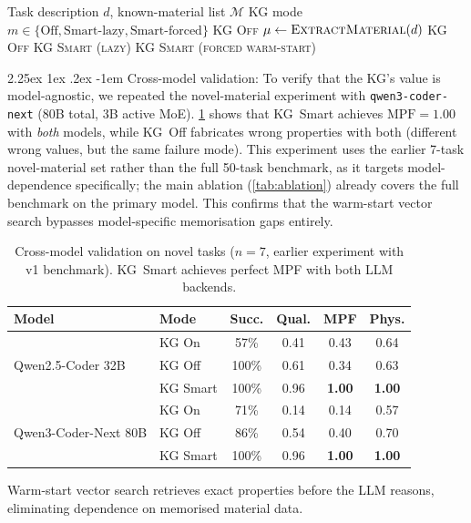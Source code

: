 \documentclass[preprint,review,12pt]{elsarticle}
\makeatletter
\renewcommand\paragraph{\@startsection{paragraph}{4}{\z@}%
  {2.25ex \@plus1ex \@minus.2ex}%
  {-1em}%
  {\normalfont\normalsize\bfseries}}
\makeatother
\begin{document}
\begin{algorithm}[t]
\caption{Adaptive KG Mode Selection}
\label{alg:kg-decision}
\begin{algorithmic}[1]
\Require Task description $d$, known-material list $\mathcal{M}$
\Ensure KG mode $m \in \{\text{Off}, \text{Smart-lazy}, \text{Smart-forced}\}$
  \State \Return \textsc{KG Off}
\EndIf
\State $\mu \gets \textsc{ExtractMaterial}(d)$
\If{$\mu = \varnothing$}
  \State \Return \textsc{KG Off}
  \State \Return \textsc{KG Smart (lazy)}
\Else
  \State \Return \textsc{KG Smart (forced warm-start)}
\EndIf
\end{algorithmic}
\end{algorithm}

\paragraph{Cross-model validation:}
To verify that the KG's value is model-agnostic, we repeated the
novel-material experiment with \texttt{qwen3-coder-next} (80B total,
3B active MoE).  \cref{tab:multi-model} shows that KG~Smart achieves
$\text{MPF}{=}1.00$ with \emph{both} models, while KG~Off fabricates
wrong properties with both (different wrong values, but the same
failure mode).  This experiment uses the earlier 7-task novel-material
set rather than the full 50-task benchmark, as it targets
model-dependence specifically; the main ablation (\cref{tab:ablation})
already covers the full benchmark on the primary model.
This confirms that the warm-start vector search
bypasses model-specific memorisation gaps entirely.

\begin{table}[t]
\centering
\caption{Cross-model validation on novel tasks ($n{=}7$, earlier
  experiment with v1 benchmark).  KG~Smart achieves perfect MPF with
  both LLM backends.}
\label{tab:multi-model}
\footnotesize
\setlength{\tabcolsep}{3pt}
\begin{tabular}{@{}llcccc@{}}
\toprule
Model & Mode & Succ. & Qual. & MPF & Phys. \\
\midrule
\multirow{3}{*}{Qwen2.5-Coder 32B}
  & KG On    & 57\% & 0.41 & 0.43 & 0.64 \\
  & KG Off   & 100\% & 0.61 & 0.34 & 0.63 \\
  & KG Smart & 100\% & 0.96 & \textbf{1.00} & \textbf{1.00} \\
\midrule
\multirow{3}{*}{Qwen3-Coder-Next 80B}
  & KG On    &  71\% & 0.14 & 0.14 & 0.57 \\
  & KG Off   &  86\% & 0.54 & 0.40 & 0.70 \\
  & KG Smart & 100\% & 0.96 & \textbf{1.00} & \textbf{1.00} \\
\bottomrule
\end{tabular}

\vspace{0.3em}
{\scriptsize Warm-start vector search retrieves exact properties before the
LLM reasons, eliminating dependence on memorised material data.}
\end{table}
\end{document}
